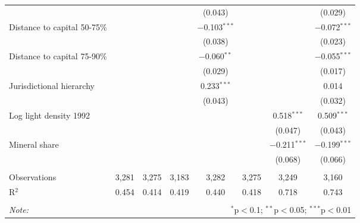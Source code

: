 \begin{table}[!htbp]
\begin{tabular}{@{\extracolsep{2pt}}lccccccc}
  &  &  &  & (0.043) &  &  & (0.029) \\ 
  Distance to capital 50-75\% &  &  &  & $-$0.103$^{***}$ &  &  & $-$0.072$^{***}$ \\ 
  &  &  &  & (0.038) &  &  & (0.023) \\ 
  Distance to capital 75-90\% &  &  &  & $-$0.060$^{**}$ &  &  & $-$0.055$^{***}$ \\ 
  &  &  &  & (0.029) &  &  & (0.017) \\ 
  Jurisdictional hierarchy &  &  &  & 0.233$^{***}$ &  &  & 0.014 \\ 
  &  &  &  & (0.043) &  &  & (0.032) \\ 
  Log light density 1992 &  &  &  &  &  & 0.518$^{***}$ & 0.509$^{***}$ \\ 
  &  &  &  &  &  & (0.047) & (0.043) \\ 
  Mineral share &  &  &  &  &  & $-$0.211$^{***}$ & $-$0.199$^{***}$ \\ 
  &  &  &  &  &  & (0.068) & (0.066) \\ 
 \hline \\[-1.8ex] 
Observations & 3,281 & 3,275 & 3,183 & 3,282 & 3,275 & 3,249 & 3,160 \\ 
R$^{2}$ & 0.454 & 0.414 & 0.419 & 0.440 & 0.418 & 0.718 & 0.743 \\ 
\hline 
\hline \\[-1.8ex] 
\textit{Note:}  & \multicolumn{7}{r}{$^{*}$p$<$0.1; $^{**}$p$<$0.05; $^{***}$p$<$0.01} \\ 
\end{tabular} 
\end{table} 
